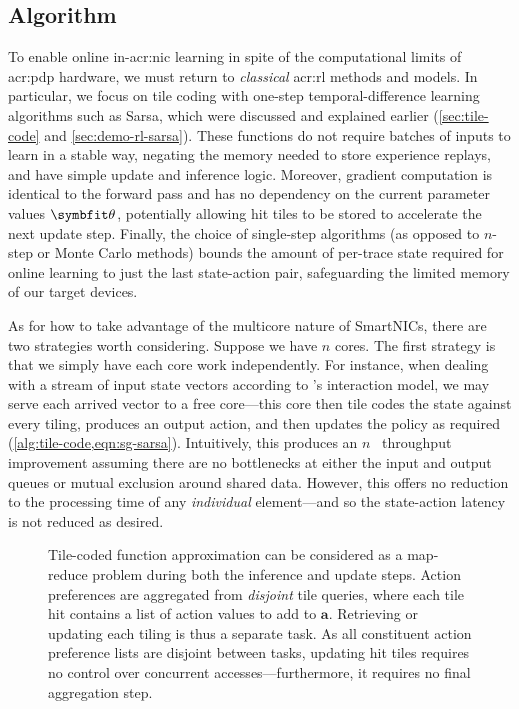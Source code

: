 \subsection{Algorithm}\label{sec:opal-algorithm}
To enable online in-\gls{acr:nic} learning in spite of the computational limits of \gls{acr:pdp} hardware, we must return to \emph{classical} \gls{acr:rl} methods and models.
In particular, we focus on tile coding with one-step temporal-difference learning algorithms such as Sarsa, which were discussed and explained earlier (\cref{sec:tile-code} and \cref{sec:demo-rl-sarsa}).
These functions do not require batches of inputs to learn in a stable way, negating the memory needed to store experience replays, and have simple update and inference logic.
Moreover, gradient computation is identical to the forward pass and has no dependency on the current parameter values $\wvec{}$, potentially allowing hit tiles to be stored to accelerate the next update step.
Finally, the choice of single-step algorithms (as opposed to $n$-step or Monte Carlo methods) bounds the amount of per-trace state required for online learning to just the last state-action pair, safeguarding the limited memory of our target devices.

As for how to take advantage of the multicore nature of SmartNICs, there are two strategies worth considering.
Suppose we have $n$ cores.
The first strategy is that we simply have each core work independently.
For instance, when dealing with a stream of input state vectors according to \approachshort{}'s interaction model, we may serve each arrived vector to a free core---this core then tile codes the state against every tiling, produces an output action, and then updates the policy as required (\cref{alg:tile-code,eqn:sg-sarsa}).
Intuitively, this produces an $n$~\unit{\times} throughput improvement assuming there are no bottlenecks at either the input and output queues or mutual exclusion around shared data.
However, this offers no reduction to the processing time of any \emph{individual} element---and so the state-action latency is not reduced as desired.

\begin{figure}
	\centering
	\resizebox{0.67\linewidth}{!}{
		
	}
	\caption[A visualisation of how tile-coding can be split into subtasks as a map-reduce problem.]{Tile-coded function approximation can be considered as a map-reduce problem during both the inference and update steps. Action preferences are aggregated from \emph{disjoint} tile queries, where each tile hit contains a list of action values to add to $\mathbf{a}$. Retrieving or updating each tiling is thus a separate task. As all constituent action preference lists are disjoint between tasks, updating hit tiles requires no control over concurrent accesses---furthermore, it requires no final aggregation step.\label{fig:opal-par-tilecode}}
\end{figure}

